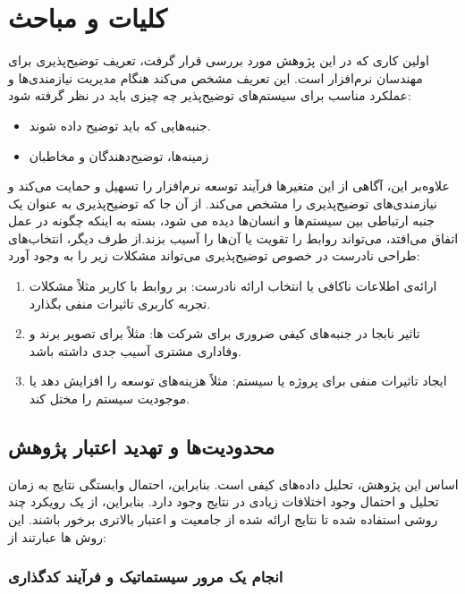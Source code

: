 \section{کلیات و مباحث}

اولین کاری که در این پژوهش مورد بررسی قرار گرفت، تعریف توضیح‌پذیری برای مهندسان
نرم‌افزار است. این تعریف مشخص می‌کند هنگام مدیریت نیازمندی‌ها و عملکرد مناسب
برای سیستم‌های توضیح‌پذیر چه چیزی باید در نظر گرفته شود:

\begin{itemize}
    \item جنبه‌هایی که باید توضیح داده شوند.
    \item زمینه‌ها، توضیح‌دهندگان و مخاطبان 
\end{itemize}

علاوه‌بر این، آگاهی از این متغیرها فرآیند توسعه نرم‌افزار را تسهیل و حمایت
می‌کند و نیازمندی‌های توضیح‌پذیری را مشخص می‌کند.  از آن جا که توضیح‌پذیری به
عنوان یک جنبه ارتباطی بین سیستم‌ها و انسان‌ها دیده می شود، بسته به اینکه چگونه
در عمل اتفاق می‌افتد، می‌تواند روابط را تقویت یا آن‌ها را آسیب بزند.از طرف دیگر،
انتخاب‌های طراحی نادرست در خصوص توضیح‌پذیری می‌تواند مشکلات زیر را به وجود آورد:

\begin{enumerate}
    \item ارائه‌ی اطلاعات ناکافی یا انتخاب‌ ارائه‌ نادرست: بر روابط با کاربر
    مثلاً مشکلات تجربه‌ کاربری تاثیرات منفی بگذارد.
    \item تاثیر نابجا در جنبه‌های کیفی ضروری برای شرکت ها: مثلاً برای تصویر برند
    و وفاداری مشتری آسیب جدی داشته باشد.
    \item ایجاد تاثیرات منفی برای پروژه یا سیستم: مثلاً هزینه‌های توسعه را
    افزایش دهد یا موجودیت سیستم را مختل کند.
\end{enumerate}

\subsection{محدودیت‌ها و تهدید اعتبار پژوهش}

اساس این پژوهش، تحلیل داده‌های کیفی است. بنابراین، احتمال وابستگی نتایج به زمان
تحلیل و احتمال وجود اختلافات زیادی در نتایج وجود دارد. بنابراین، از یک رویکرد
چند روشی استفاده شده تا نتایج ارائه شده از جامعیت و اعتبار بالاتری برخور باشند.
این روش ها عبارتند از:

\subsubsection{انجام یک مرور سیستماتیک و فرآیند کدگذاری}


